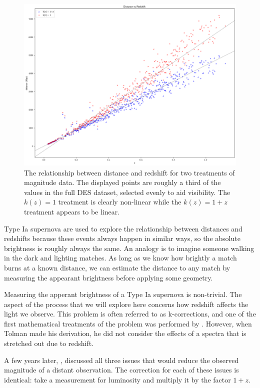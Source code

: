 \documentclass{article}
\begin{document}
\begin{figure}[h]
  \includegraphics[width=\linewidth]{mu_distance_vs_redshift.png}
  \caption{The relationship between distance and redshift for two treatments of
  magnitude data. The displayed points are roughly a third of the values in the
  full DES dataset, selected evenly to aid visibility. The $k(z) = 1$ treatment
  is clearly non-linear while the $k(z) = 1 + z$ treatment appears to be
  linear.}
  \label{fig:mu_distance_vs_redshift}
\end{figure}

Type Ia supernova are used to explore the relationship between distances and
redshifts because these events always happen in similar ways, so the absolute
brightness is roughly always the same. An analogy is to imagine someone walking
in the dark and lighting matches. As long as we know how brightly a match burns
at a known distance, we can estimate the distance to any match by measuring the
appearant brightness before applying some geometry.

Measuring the apperant brightness of a Type Ia supernova is non-trivial. The
aspect of the process that we will explore here concerns how redshift affects
the light we observe. This problem is often referred to as k-corrections, and
one of the first mathematical treatments of the problem was performed by
\citet{tolman1930}. However, when Tolman made his derivation, he did not
consider the effects of a spectra that is stretched out due to redshift.

A few years later, \citet{desitter1934}, discussed all three issues that would
reduce the observed magnitude of a distant observation. The correction for each
of these issues is identical: take a measurement for luminosity and multiply it
by the factor $1 + z$.
\end{document}
